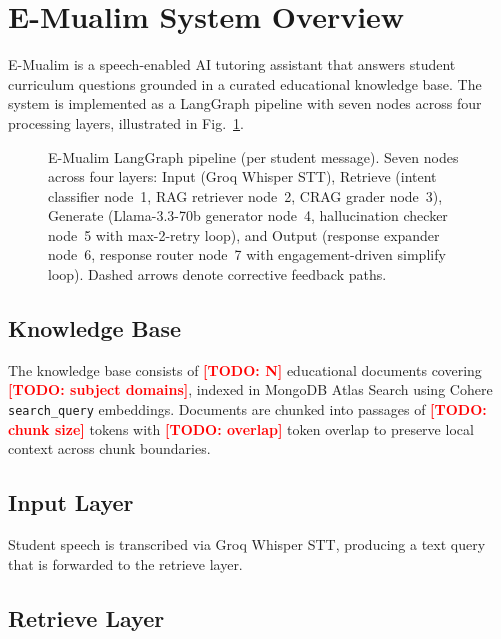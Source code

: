 \documentclass[conference]{IEEEtran}
\newcommand{\todo}[1]{\textcolor{red}{\textbf{[TODO: #1]}}}
\begin{document}
\section{E-Mualim System Overview}
\label{sec:system}

E-Mualim is a speech-enabled AI tutoring assistant that answers
student curriculum questions grounded in a curated educational
knowledge base.
The system is implemented as a LangGraph pipeline with seven nodes
across four processing layers, illustrated in Fig.~\ref{fig:pipeline}.

\begin{figure}[htbp]
  \centering
  \fbox{\rule{0pt}{4.2cm}\rule{\dimexpr\columnwidth-2\fboxsep\relax}{0pt}}
  \caption{E-Mualim LangGraph pipeline (per student message). Seven
  nodes across four layers: Input (Groq Whisper STT), Retrieve
  (intent classifier node~1, RAG retriever node~2, CRAG grader
  node~3), Generate (Llama-3.3-70b generator node~4, hallucination
  checker node~5 with max-2-retry loop), and Output (response
  expander node~6, response router node~7 with engagement-driven
  simplify loop). Dashed arrows denote corrective feedback paths.}
  \label{fig:pipeline}
\end{figure}

\subsection{Knowledge Base}

The knowledge base consists of \todo{N} educational documents
covering \todo{subject domains}, indexed in MongoDB Atlas Search
using Cohere \texttt{search\_query} embeddings.
Documents are chunked into passages of \todo{chunk size} tokens with
\todo{overlap} token overlap to preserve local context across
chunk boundaries.

\subsection{Input Layer}

Student speech is transcribed via Groq Whisper STT, producing a text
query that is forwarded to the retrieve layer.

\subsection{Retrieve Layer}
\end{document}
